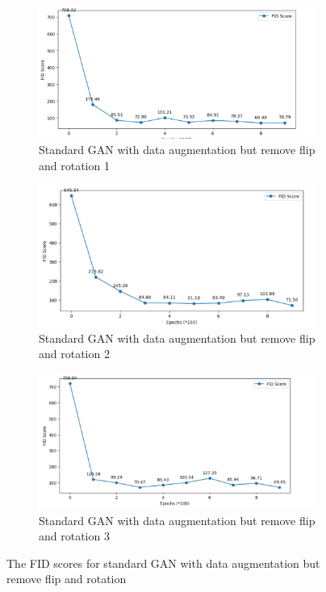 \begin{figure}[H]
    \centering
    \begin{subfigure}[b]{\linewidth}
        \centering
        \includegraphics[width=0.84\linewidth]{./Images/data_augementation_remove_rotation1.jpg}
        \caption{Standard GAN with data augmentation but remove flip and rotation 1}
        \label{fig:Dense}
    \end{subfigure}
    \vspace{0.05\linewidth} 
    \begin{subfigure}[b]{\linewidth}
        \centering
        \includegraphics[width=0.8\linewidth]{./Images/data_augementation_remove_rotation2.jpg}
        \caption{Standard GAN with data augmentation but remove flip and rotation 2}
        \label{fig:Conv2DTranspose}
    \end{subfigure}
    \begin{subfigure}[b]{\linewidth}
        \centering
        \includegraphics[width=0.8\linewidth]{./Images/data_augementation_remove_rotation3.jpg}
        \caption{Standard GAN with data augmentation but remove flip and rotation 3}
        \label{fig:Conv2DTranspose}
    \end{subfigure}
    \caption{The FID scores for standard GAN with data augmentation but remove flip and rotation}
    \label{fig:combined}
\end{figure}


